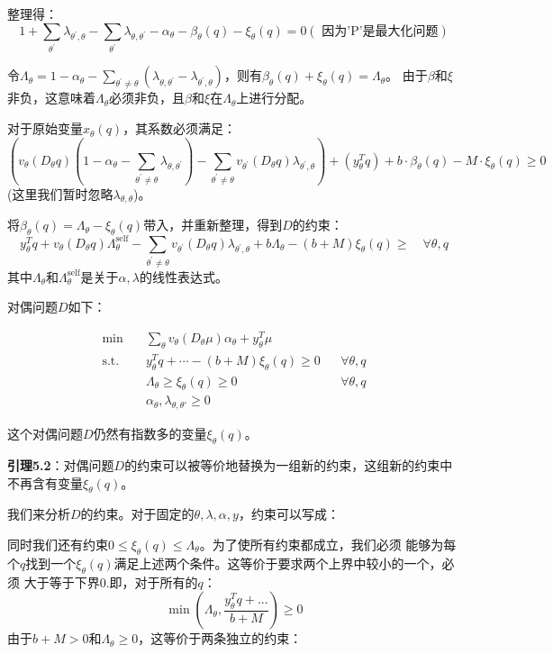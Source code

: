 整理得：
$$1+\sum\limits_{\theta^\prime}\lambda_{\theta^\prime,\theta}-\sum\limits_{\theta^\prime}\lambda_{\theta,\theta^\prime}-\alpha_{\theta}-\beta_{\theta} (q) - \xi_{\theta}(q) = 0(\text{ 因为'P'是最大化问题})$$

令$\Lambda_\theta = 1 - \alpha_\theta - \sum\limits_{\theta^\prime \neq\theta}(\lambda_{\theta,\theta^\prime}-\lambda_{\theta^\prime,\theta})$，则有$\beta_{\theta}(q) + \xi_{\theta}(q) = \Lambda_\theta$。
由于$\beta$和$\xi$非负，这意味着$\Lambda_\theta$必须非负，且$\beta$和$\xi$在$\Lambda_\theta$上进行分配。

对于原始变量$x_\theta (q)$，其系数必须满足：
$$\left(v_\theta (D_\theta q)(1 - \alpha_\theta - \sum\limits_{\theta^\prime \neq\theta}\lambda_{\theta,\theta^\prime}) - \sum\limits_{\theta^\prime \neq \theta}v_{\theta^\prime} (D_{\theta} q)\lambda_{\theta^\prime,\theta}\right) + (y_{\theta}^T q) + b\cdot \beta_\theta (q) - M\cdot \xi_{\theta}(q)\geq 0$$
(这里我们暂时忽略$\lambda_{\theta,\theta}$)。

将$\beta_\theta (q) = \Lambda_\theta - \xi_\theta (q)$带入，并重新整理，得到$D$的约束：
$$y_{\theta}^T q + v_\theta (D_\theta q)\Lambda_{\theta}^{\text{self}} - \sum\limits_{\theta^\prime\neq\theta}v_{\theta^\prime}(D_\theta q)\lambda_{\theta^\prime,\theta} + b\Lambda_\theta - (b+M)\xi_\theta (q) \geq \quad \forall \theta,q$$
其中$\Lambda_\theta$和$\Lambda_{\theta}^{\text{self}}$是关于$\alpha,\lambda$的线性表达式。

对偶问题$D$如下：

\begin{align*}
    \min \quad & \sum_{\theta} v_{\theta}(D_{\theta}\mu)\alpha_{\theta} + y_{\theta}^{T}\mu \\
    \text{s.t.} \quad & y_{\theta}^{T}q + \cdots - (b+M)\xi_{\theta}(q) \geq 0 && \forall \theta, q \\
    & \Lambda_{\theta} \geq \xi_{\theta}(q) \geq 0 && \forall \theta, q \\
    & \alpha_{\theta}, \lambda_{\theta, \theta'} \geq 0
\end{align*}

这个对偶问题$D$仍然有指数多的变量$\xi_\theta (q)$。

\textbf{引理5.2}：对偶问题$D$的约束可以被等价地替换为一组新的约束，这组新的约束中不再含有变量$\xi_\theta (q)$。

我们来分析$D$的约束。对于固定的$\theta,\lambda,\alpha,y$，约束可以写成：

同时我们还有约束$0\leq \xi_\theta (q)\leq \Lambda_\theta$。为了使所有约束都成立，我们必须
能够为每个$q$找到一个$\xi_\theta (q)$满足上述两个条件。这等价于要求两个上界中较小的一个，必须
大于等于下界0.即，对于所有的$q$：
$$\min \left(\Lambda_\theta, \frac{y_{\theta}^T q+...}{b+M}\right)\geq 0$$
由于$b+M>0$和$\Lambda_\theta\geq 0$，这等价于两条独立的约束：

